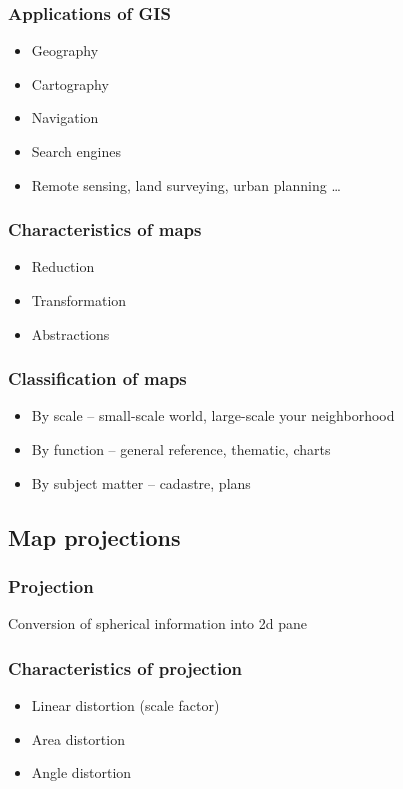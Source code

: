 \documentclass{beamer}
\begin{document}
\begin{frame}
  \frametitle{Applications of GIS}
  \begin{itemize}
  \item Geography
  \item Cartography
  \item Navigation
  \item Search engines
  \item Remote sensing, land surveying, urban planning \ldots{}
  \end{itemize}
\end{frame}

\begin{frame}
  \frametitle{Characteristics of maps}
  \begin{itemize}
  \item<1-> Reduction 
  \item<3-> Transformation 
  \item<5-> Abstractions 
  \end{itemize}
\end{frame}

\begin{frame}
  \frametitle{Classification of maps}
  \begin{itemize}
  \item By scale -- small-scale world, large-scale your neighborhood
  \item By function -- general reference, thematic, charts
  \item By subject matter -- cadastre, plans
  \end{itemize}
\end{frame}


\subsection{Map projections}

\begin{frame}
  \frametitle{Projection}
  Conversion of spherical information into 2d pane
\end{frame}

\begin{frame}
  \frametitle{Characteristics of projection}
  \begin{itemize}
  \item Linear distortion (scale factor)
  \item Area distortion
  \item Angle distortion
  \end{itemize}
\end{frame}
\end{document}
